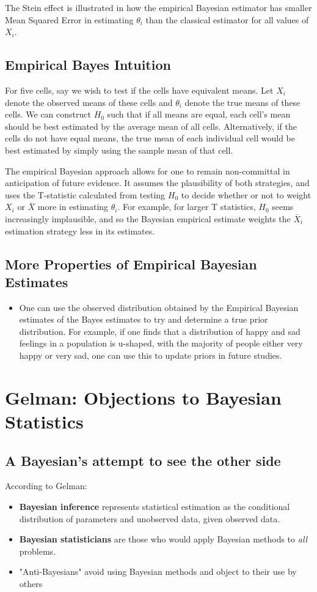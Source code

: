 \documentclass{article}
\begin{document}
The Stein effect is illustrated in how the empirical Bayesian estimator has smaller Mean Squared Error in estimating $\theta_i$ than the classical estimator for all values of $X_i$.

\subsection{Empirical Bayes Intuition}

For five cells, say we wish to test if the cells have equivalent means. Let $X_i$ denote the observed means of these cells and $\theta_i$ denote the true means of these cells. We can construct $H_0$ such that if all means are equal, each cell's mean should be best estimated by the average mean of all cells. Alternatively, if the cells do not have equal means, the true mean of each individual cell would be best estimated by simply using the sample mean of that cell.

The empirical Bayesian approach allows for one to remain non-committal in anticipation of future evidence. It assumes the plausibility of both strategies, and uses the T-statistic calculated from testing $H_0$ to decide whether or not to weight $X_i$ or $\bar X$ more in estimating $\theta_i$. For example, for larger T statistics, $H_0$ seems increasingly implausible, and so the Bayesian empirical estimate weights the $\bar X_i$ estimation strategy less in its estimates. 

\subsection{More Properties of Empirical Bayesian Estimates }

\begin{itemize}
\item One can use the observed distribution obtained by the Empirical Bayesian estimates of the Bayes estimates to try and determine a true prior distribution. For example, if one finds that a distribution of happy and sad feelings in a population is u-shaped, with the majority of people either very happy or very sad, one can use this to update priors in future studies.
\end{itemize}


\section{Gelman: Objections to Bayesian Statistics}
\subsection{A Bayesian’s attempt to see the other side}
According to Gelman:
\begin{itemize}
\item \textbf{Bayesian inference} represents statistical estimation as the conditional distribution of parameters and unobserved data, given observed data.
\item \textbf{Bayesian statisticians} are those who would apply Bayesian methods to \textit{all} problems.
\item "Anti-Bayesians" avoid using Bayesian methods and object to their use by others
\end{itemize}
\end{document}
